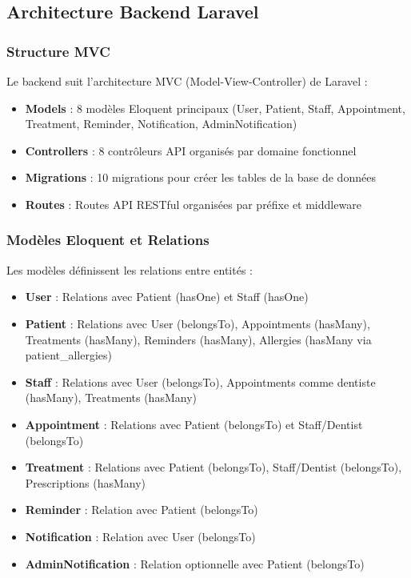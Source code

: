 \documentclass[12pt,a4paper]{report}
\begin{document}
\subsection{Architecture Backend Laravel}

\subsubsection{Structure MVC}

Le backend suit l'architecture MVC (Model-View-Controller) de Laravel :

\begin{itemize}
    \item \textbf{Models} : 8 modèles Eloquent principaux (User, Patient, Staff, Appointment, Treatment, Reminder, Notification, AdminNotification)
    \item \textbf{Controllers} : 8 contrôleurs API organisés par domaine fonctionnel
    \item \textbf{Migrations} : 10 migrations pour créer les tables de la base de données
    \item \textbf{Routes} : Routes API RESTful organisées par préfixe et middleware
\end{itemize}

\subsubsection{Modèles Eloquent et Relations}

Les modèles définissent les relations entre entités :

\begin{itemize}
    \item \textbf{User} : Relations avec Patient (hasOne) et Staff (hasOne)
    \item \textbf{Patient} : Relations avec User (belongsTo), Appointments (hasMany), Treatments (hasMany), Reminders (hasMany), Allergies (hasMany via patient\_allergies)
    \item \textbf{Staff} : Relations avec User (belongsTo), Appointments comme dentiste (hasMany), Treatments (hasMany)
    \item \textbf{Appointment} : Relations avec Patient (belongsTo) et Staff/Dentist (belongsTo)
    \item \textbf{Treatment} : Relations avec Patient (belongsTo), Staff/Dentist (belongsTo), Prescriptions (hasMany)
    \item \textbf{Reminder} : Relation avec Patient (belongsTo)
    \item \textbf{Notification} : Relation avec User (belongsTo)
    \item \textbf{AdminNotification} : Relation optionnelle avec Patient (belongsTo)
\end{itemize}
\end{document}
